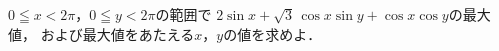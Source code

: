 \documentclass[../../main.tex]{subfiles}
\begin{document}
$0 \leqq x<2\pi$，$0 \leqq y<2\pi$の範囲で
$2\sin x+\sqrt{3} \, \cos x\sin y+\cos x\cos y$の最大値，
および最大値をあたえる$x$，$y$の値を求めよ．
\end{document}
